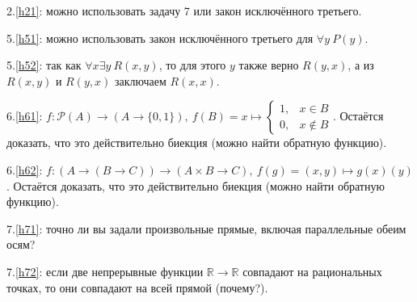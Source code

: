 \documentclass{article}
\newcommand{\R}{\mathbb{R}}
\begin{document}
2.\ref{h21}: можно использовать задачу 7 или закон исключённого третьего.

5.\ref{h51}: можно использовать закон исключённого третьего для $\forall y~P(y)$.

5.\ref{h52}: так как $\forall x \exists y~R(x,y)$, то для этого $y$ также верно $R(y,x)$, а из $R(x,y)$ и $R(y,x)$ заключаем $R(x,x)$.

6.\ref{h61}: $f: \mathcal{P}(A) \to (A \to \{0,1\}),~f(B) = x \mapsto \begin{cases} 1, & x \in B \\ 0, & x \notin B \end{cases}$. Остаётся доказать, что это действительно биекция (можно найти обратную функцию).

6.\ref{h62}: $f: (A \to (B \to C)) \to (A \times B \to C),~f(g) = (x,y) \mapsto g(x)(y)$. Остаётся доказать, что это действительно биекция (можно найти обратную функцию).

7.\ref{h71}: точно ли вы задали произвольные прямые, включая параллельные обеим осям?

7.\ref{h72}: если две непрерывные функции $\R \to \R$ совпадают на рациональных точках, то они совпадают на всей прямой (почему?).
\end{document}
